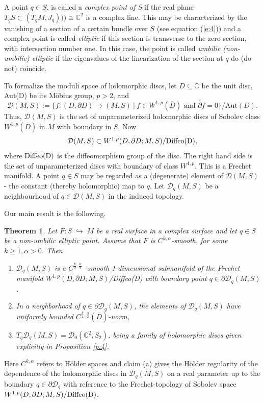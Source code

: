 \documentclass{amsart}
\newtheorem{theorem}{Theorem}
\begin{document}
A point $ q\in S$, is called a \textit{complex point of S} if the real plane $T_ q  S\subset(T_{q} M,J_q))) \cong {\mathbb{C}}^2$ is a complex line. This may be characterized by the vanishing of a section of a certain bundle over $S$ (see equation (\ref{e:4})) and a complex point is called \textit{elliptic} if this section is transverse to the zero section, with intersection number one. In this case, the point  is called \textit{umbilic (non-umbilic) elliptic} if the eigenvalues of the linearization of the section at $q$ do  (do not) coincide. 

To formalize the moduli space of holomorphic discs, let $D\subseteq{\mathbb{C}}$ be the unit disc, Aut(D)  be  its M\"obius group, $p > 2$,  and 
\[
{\mathcal D}(M, S):=\{f:(D,\partial D)\to(M, S)\:|\:f\in W^{1,p}(\overline D) {\mbox{ and }} \bar\partial f=0\}/\mbox{Aut}(D).
\]
Thus, ${\mathcal D}(M, S)$ is the set of unparameterized holomorphic discs of Sobolev class $W^{1,p}(\overline D)$ in $M$ with boundary in $S$. Now 
\[
{\mathcal D}(M, S) \subset W^{1,p}(D,\partial D; M,  S)/\rm{Diffeo}(D),
\]
where $\rm{Diffeo}(D)$ is the diffeomorphism group of the disc. The right hand side is the set of unparameterized discs with boundary of class $W^{1,p}$. This is a Frechet manifold. A point $ q\in S$ may be regarded as a (degenerate) element of ${\mathcal D}(M, S)$ - the constant (thereby holomorphic) map to $q$. Let ${\mathcal D}_ q(M, S)$ be a neighbourhood of $ q\in{\mathcal D}(M, S)$ in the induced topology. 

Our main result is the following.
\\
\begin{theorem} \label{t:1} 
Let $F: S\;{\hookrightarrow}\; M$ be a real surface in a complex surface and let $ q\in S$ be a non-umbilic elliptic point. Assume that $F$ is $C^{k,\alpha}$-smooth, for some $k \ge 1, \alpha > 0$. Then  
\begin{enumerate}
\item[(a)]  ${\mathcal D}_ q(M, S)$ is a $C^{\frac{k}{2},\frac{\alpha}{2}}$ -smooth 1-dimensional submanifold of the Frechet manifold $W^{1,p}(D,\partial D;M, S) ${\rm /Diffeo(D)} with boundary point $ q\in\partial{\mathcal D}_ q(M, S)$,
\item[(b)] In a neighborhood of $ q\in\partial{\mathcal D}_ q(M, S)$, the elements of ${\mathcal D}_ q(M, S)$ have uniformly bounded $C^{\frac{k}{2},\frac{\alpha}{2}}(\overline D )$-norm, 
\item[(c)] $T_ q{\mathcal D}_ q(M, S)={\mathcal D}_0({\mathbb{C}}^2,  S_2)$, being a family of holomorphic discs given explicitly in Proposition \ref{p:4}.
\end{enumerate} 
\end{theorem}
Here $C^{k,\alpha}$ refers to H\"older spaces and claim (a) gives the H\"older regularity of the dependence of the holomorphic discs in ${\mathcal D}_ q(M, S)$ on a real parameter up to the boundary $q\in {\partial\mathcal D}_ q$ with reference to the Frechet-topology of Sobolev space $W^{1,p}(D,\partial D;M, S){\rm /Diffeo(D)}$.
\end{document}

